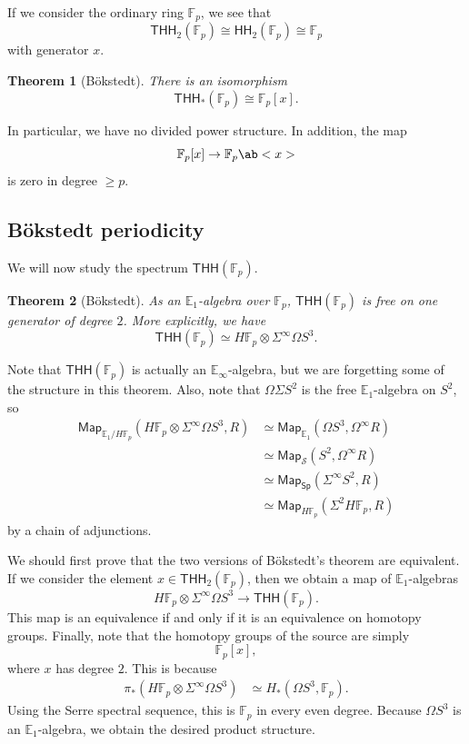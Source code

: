 \documentclass[10pt, oneside]{memoir}
\newtheorem{thm}{Theorem}[subsection]
\theoremstyle{definition}
\theoremstyle{remark}
\theoremstyle{plain}
\theoremstyle{definition}
\theoremstyle{remark}
\newcommand{\E}{\mathbb{E}}
\newcommand{\F}{\mathbb{F}}
\newcommand{\mc}[1]{\mathcal{#1}}
\newcommand{\ms}[1]{\mathsf{#1}}
\newcommand{\1}{\mathbf{1}}
\newcommand{\2}{\mathbf{2}}
\newcommand{\3}{\mathbf{3}}
\newcommand{\THH}{\ms{THH}}
\newcommand{\HH}{\ms{HH}}
\begin{document}
If we consider the ordinary ring \(\F_p \), we see that 
\[ \THH_2(\F_p) \cong \HH_2(\F_p) \cong \F_p \]
with generator \(x \).

\begin{thm}[B\"okstedt]\label{thm:bokstedt}
    There is an isomorphism
    \[ \THH_*(\F_p) \cong \F_p[x]. \]
\end{thm}

In particular, we have no divided power structure. In addition, the map
\[ \F_p[x] \to \F_p \ab<x> \]
is zero in degree \(\geq p \).

\subsection{B\"okstedt periodicity}%

We will now study the spectrum \(\THH(\F_p) \).

\begin{thm}[B\"okstedt]
    As an \(\E_1 \)-algebra over \(\F_p \), \(\THH(\F_p) \) is free on one generator of degree \(2 \). More explicitly, we have
    \[ \THH(\F_p) \simeq H \F_p \otimes \Sigma^{\infty} \Omega S^3. \]
\end{thm}

Note that \(\THH(\F_p) \) is actually an \(\E_{\infty} \)-algebra, but we are forgetting some of the structure in this theorem. Also, note that \(\Omega \Sigma S^2 \) is the free \(\E_1 \)-algebra on \(S^2 \), so
\begin{align*}
    \ms{Map}_{\E_1/H\F_p} (H \F_p \otimes \Sigma^{\infty}\Omega S^3, R) &\simeq \ms{Map}_{\E_1} (\Omega S^3, \Omega^{\infty}R) \\
    &\simeq \ms{Map}_{\mc{S}}(S^2, \Omega^{\infty} R) \\
    &\simeq \ms{Map}_{\ms{Sp}}(\Sigma^{\infty}S^2, R) \\
    &\simeq \ms{Map}_{H\F_p} (\Sigma^2 H\F_p, R)
\end{align*}
by a chain of adjunctions.

We should first prove that the two versions of B\"okstedt's theorem are equivalent. If we consider the element \(x \in \THH_2(\F_p) \), then we obtain a map of \(\E_1 \)-algebras
\[ H \F_p \otimes \Sigma^{\infty} \Omega S^3 \to \THH(\F_p). \]
This map is an equivalence if and only if it is an equivalence on homotopy groups. Finally, note that the homotopy groups of the source are simply
\[ \F_p [x], \]
where \(x \) has degree \(2 \). This is because
\begin{align*}
    \pi_* (H \F_p \otimes \Sigma^{\infty} \Omega S^3) &\simeq H_* (\Omega S^3, \F_p).
\end{align*}
Using the Serre spectral sequence, this is \(\F_p \) in every even degree. Because \(\Omega S^3 \) is an \(\E_1 \)-algebra, we obtain the desired product structure.
\end{document}
